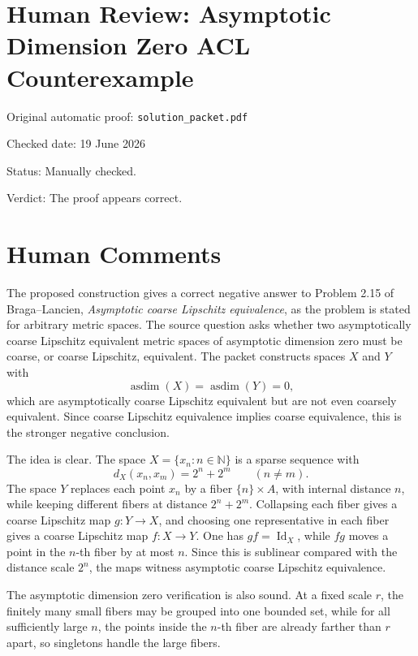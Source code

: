 ﻿\documentclass[11pt]{article}
\begin{document}
\section*{Human Review: Asymptotic Dimension Zero ACL Counterexample}

\noindent Original automatic proof: \texttt{solution\_packet.pdf}

\noindent Checked date: 19 June 2026

\noindent Status: Manually checked.

\noindent Verdict: The proof appears correct.

\section*{Human Comments}

The proposed construction gives a correct negative answer to Problem 2.15 of
Braga--Lancien, \emph{Asymptotic coarse Lipschitz equivalence}, as the problem is
stated for arbitrary metric spaces.  The source question asks whether two
asymptotically coarse Lipschitz equivalent metric spaces of asymptotic dimension
zero must be coarse, or coarse Lipschitz, equivalent.  The packet constructs
spaces \(X\) and \(Y\) with
\[
  \operatorname{asdim}(X)=\operatorname{asdim}(Y)=0,
\]
which are asymptotically coarse Lipschitz equivalent but are not even coarsely
equivalent.  Since coarse Lipschitz equivalence implies coarse equivalence, this
is the stronger negative conclusion.

The idea is clear.  The space \(X=\{x_n:n\in\mathbb N\}\) is a sparse sequence
with
\[
  d_X(x_n,x_m)=2^n+2^m\qquad(n\neq m).
\]
The space \(Y\) replaces each point \(x_n\) by a fiber \(\{n\}\times A\), with
internal distance \(n\), while keeping different fibers at distance
\(2^n+2^m\).  Collapsing each fiber gives a coarse Lipschitz map
\(g:Y\to X\), and choosing one representative in each fiber gives a coarse
Lipschitz map \(f:X\to Y\).  One has \(gf=\operatorname{Id}_X\), while
\(fg\) moves a point in the \(n\)-th fiber by at most \(n\).  Since this is
sublinear compared with the distance scale \(2^n\), the maps witness asymptotic
coarse Lipschitz equivalence.

The asymptotic dimension zero verification is also sound.  At a fixed scale
\(r\), the finitely many small fibers may be grouped into one bounded set, while
for all sufficiently large \(n\), the points inside the \(n\)-th fiber are already
farther than \(r\) apart, so singletons handle the large fibers.
\end{document}
